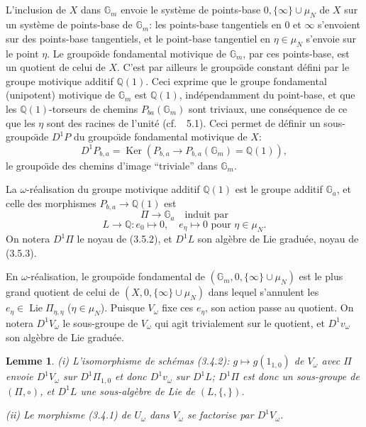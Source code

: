 \documentclass[11pt,a4paper]{article}
\theoremstyle{plain}
\newtheorem{lemma}[theorem]{Lemme}
\theoremstyle{definition}
\DeclareMathOperator{\Ker}{Ker}
\DeclareMathOperator{\Lie}{Lie}
\newcommand{\Gm}{\mathbb{G}_m}
\newcommand{\Ga}{\mathbb{G}_a}
\newcommand{\Q}{\mathbb{Q}}
\begin{document}
\subsection{}
L'inclusion de $X$ dans $\Gm$ envoie le syst\`eme de points-base $0, \{\infty\} \cup \mu_N$ de $X$ sur un syst\`eme de points-base de $\Gm$: les points-base tangentiels en $0$ et $\infty$ s'envoient sur des points-base tangentiels, et le point-base tangentiel en $\eta \in \mu_N$ s'envoie sur le point $\eta$. Le groupo\"{\i}de fondamental motivique de $\Gm$, par ces points-base, est un quotient de celui de $X$. C'est par ailleurs le groupo\"{\i}de constant d\'efini par le groupe motivique additif $\Q(1)$. Ceci exprime que le groupe fondamental (unipotent) motivique de $\Gm$ est $\Q(1)$, ind\'ependamment du point-base, et que les $\Q(1)$-torseurs de chemins $P_{ba}(\Gm)$ sont triviaux, une cons\'equence de ce que les $\eta$ sont des racines de l'unit\'e (cf.~\cite{1}~5.1). Ceci permet de d\'efinir un sous-groupo\"{\i}de $D^1P$ du groupo\"{\i}de fondamental motivique de $X$:
\begin{equation}\label{eq:3.5.1}
D^1P_{b,a} = \Ker(P_{b,a} \to P_{b,a}(\Gm) = \Q(1)),
\end{equation}
le groupo\"{\i}de des chemins d'image ``triviale'' dans $\Gm$.

La $\omega$-r\'ealisation du groupe motivique additif $\Q(1)$ est le groupe additif $\Ga$, et celle des morphismes $P_{b,a} \to \Q(1)$ est
\begin{equation}\label{eq:3.5.2}
\Pi \to \Ga \quad \text{induit par}
\end{equation}
\begin{equation}\label{eq:3.5.3}
L \to \Q: e_0 \mapsto 0, \quad e_\eta \mapsto 0 \text{ pour } \eta \in \mu_N.
\end{equation}
On notera $D^1\Pi$ le noyau de (3.5.2), et $D^1L$ son alg\`ebre de Lie gradu\'ee, noyau de (3.5.3).

En $\omega$-r\'ealisation, le groupo\"{\i}de fondamental de $(\Gm, 0, \{\infty\} \cup \mu_N)$ est le plus grand quotient de celui de $(X, 0, \{\infty\} \cup \mu_N)$ dans lequel s'annulent les $e_\eta \in \Lie \Pi_{\eta,\eta}$ ($\eta \in \mu_N$). Puisque $V_\omega$ fixe ces $e_\eta$, son action passe au quotient. On notera $D^1V_\omega$ le sous-groupe de $V_\omega$ qui agit trivialement sur le quotient, et $D^1v_\omega$ son alg\`ebre de Lie gradu\'ee.

\begin{lemma}\label{lem:3.6}
\emph{(i)} L'isomorphisme de sch\'emas (3.4.2): $g \mapsto g(1_{1,0})$ de $V_\omega$ avec $\Pi$ envoie $D^1V_\omega$ sur $D^1\Pi_{1,0}$ et donc $D^1v_\omega$ sur $D^1L$; $D^1\Pi$ est donc un sous-groupe de $(\Pi, \circ)$, et $D^1L$ une sous-alg\`ebre de Lie de $(L, \{,\})$.

\emph{(ii)} Le morphisme (3.4.1) de $U_\omega$ dans $V_\omega$ se factorise par $D^1V_\omega$.
\end{lemma}
\end{document}
